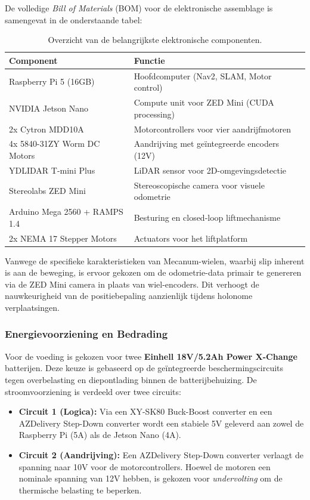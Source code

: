 De volledige \textit{Bill of Materials} (BOM) voor de elektronische assemblage is samengevat in de onderstaande tabel:

\begin{table}[h]
\centering
\small
\begin{tabular}{ll}
\hline
\textbf{Component} & \textbf{Functie} \\
\hline
Raspberry Pi 5 (16GB) & Hoofdcomputer (Nav2, SLAM, Motor control) \\
NVIDIA Jetson Nano & Compute unit voor ZED Mini (CUDA processing) \\
2x Cytron MDD10A & Motorcontrollers voor vier aandrijfmotoren \\
4x 5840-31ZY Worm DC Motors & Aandrijving met geïntegreerde encoders (12V) \\
YDLIDAR T-mini Plus & LiDAR sensor voor 2D-omgevingsdetectie \\
Stereolabs ZED Mini & Stereoscopische camera voor visuele odometrie \\
Arduino Mega 2560 + RAMPS 1.4 & Besturing en closed-loop liftmechanisme \\
2x NEMA 17 Stepper Motors & Actuators voor het liftplatform \\
\hline
\end{tabular}
\caption{Overzicht van de belangrijkste elektronische componenten.}
\end{table}

Vanwege de specifieke karakteristieken van Mecanum-wielen, waarbij slip inherent is aan de beweging, is ervoor gekozen om de odometrie-data primair te genereren via de ZED Mini camera in plaats van wiel-encoders. Dit verhoogt de nauwkeurigheid van de positiebepaling aanzienlijk tijdens holonome verplaatsingen.

\subsubsection{Energievoorziening en Bedrading}
Voor de voeding is gekozen voor twee \textbf{Einhell 18V/5.2Ah Power X-Change} batterijen. Deze keuze is gebaseerd op de geïntegreerde beschermingscircuits tegen overbelasting en diepontlading binnen de batterijbehuizing. De stroomvoorziening is verdeeld over twee circuits:
\begin{itemize}
\item \textbf{Circuit 1 (Logica):} Via een XY-SK80 Buck-Boost converter en een AZDelivery Step-Down converter wordt een stabiele 5V geleverd aan zowel de Raspberry Pi (5A) als de Jetson Nano (4A).
\item \textbf{Circuit 2 (Aandrijving):} Een AZDelivery Step-Down converter verlaagt de spanning naar 10V voor de motorcontrollers. Hoewel de motoren een nominale spanning van 12V hebben, is gekozen voor \textit{undervolting} om de thermische belasting te beperken.
\end{itemize}

